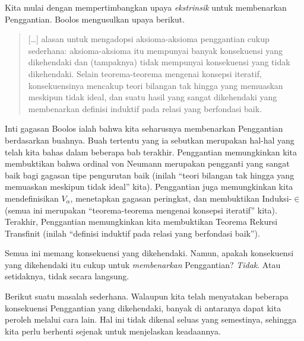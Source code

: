 \documentclass[../../../include/open-logic-section]{subfiles}
\begin{document}

Kita mulai dengan mempertimbangkan upaya \emph{ekstrinsik} untuk membenarkan
Penggantian. Boolos mengusulkan upaya berikut.
\begin{quote}
  [\ldots] alasan untuk mengadopsi aksioma-aksioma penggantian cukup
  sederhana: aksioma-aksioma itu mempunyai banyak konsekuensi yang
  dikehendaki dan (tampaknya) tidak mempunyai konsekuensi yang tidak
  dikehendaki. Selain teorema-teorema mengenai konsepsi iteratif,
  konsekuensinya mencakup teori bilangan tak hingga yang memuaskan meskipun
  tidak ideal, dan suatu hasil yang sangat dikehendaki yang membenarkan
  definisi induktif pada relasi yang berfondasi baik.
  \citep[229]{Boolos1971}
\end{quote}
Inti gagasan Boolos ialah bahwa kita seharusnya membenarkan Penggantian
berdasarkan buahnya. Buah tertentu yang ia sebutkan merupakan hal-hal yang
telah kita bahas dalam beberapa bab terakhir. Penggantian memungkinkan kita
membuktikan bahwa ordinal von Neumann merupakan pengganti yang sangat baik
bagi gagasan tipe pengurutan baik (inilah ``teori bilangan tak hingga yang
memuaskan meskipun tidak ideal'' kita). Penggantian juga memungkinkan kita
mendefinisikan $V_\alpha$, menetapkan gagasan peringkat, dan membuktikan
Induksi-$\in$ (semua ini merupakan ``teorema-teorema mengenai konsepsi
iteratif'' kita). Terakhir, Penggantian memungkinkan kita membuktikan Teorema
Rekursi Transfinit (inilah ``definisi induktif pada relasi yang berfondasi
baik'').

Semua ini memang konsekuensi yang dikehendaki. Namun, apakah konsekuensi yang
dikehendaki itu cukup untuk \emph{membenarkan} Penggantian? \emph{Tidak}.
Atau setidaknya, tidak secara langsung.

Berikut suatu masalah sederhana. Walaupun kita telah menyatakan beberapa
konsekuensi Penggantian yang dikehendaki, banyak di antaranya dapat kita
peroleh melalui cara lain. Hal ini tidak dikenal seluas yang semestinya,
sehingga kita perlu berhenti sejenak untuk menjelaskan keadaannya.
\end{document}
